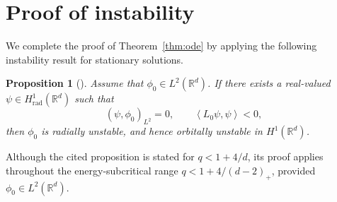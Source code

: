 \documentclass[12pt, a4paper, reqno]{amsart}
\numberwithin{equation}{section}
\newtheorem{proposition}[theorem]{Proposition}
\theoremstyle{definition}
\theoremstyle{remark}
\newcommand{\R}{\mathbb R}
\def\tbra[#1,#2]{{\left\langle #1,#2\right\rangle}}
\def\rbra[#1,#2]{{\left( #1,#2\right)}}
\newcommand{\rad}{\mathrm{rad}}
\begin{document}


\section{Proof of instability}\label{sec:inst}

We complete the proof of Theorem~\ref{thm:ode} by applying the following instability result for stationary solutions.

\begin{proposition}[{\cite[Proposition~5.3]{FH25}}]\label{prop:inst}
Assume that $\phi_0\in L^2(\R^d)$. If there exists a real-valued
$\psi\in H^1_{\rad}(\R^d)$ such that
\[
  \rbra[\psi,\phi_0]_{L^2}=0,
  \qquad
  \tbra[L_0\psi,\psi]<0,
\]
then $\phi_0$ is radially unstable, and hence orbitally unstable in
$H^1(\R^d)$.
\end{proposition}

Although the cited proposition is stated for $q<1+4/d$, its proof
applies throughout the energy-subcritical range $q<1+4/(d-2)_+$, provided
$\phi_0\in L^2(\R^d)$. 
\end{document}
